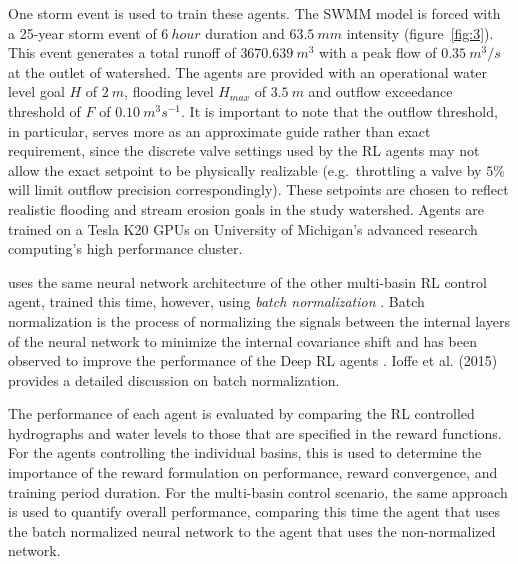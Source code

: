 One storm event is used to train these agents.
The SWMM model is forced with a 25-year storm event of $6\ hour$ duration and $63.5\ mm$ intensity (figure~\ref{fig:3}).
This event generates a total runoff of $3670.639\ m^3$ with a peak flow of $0.35\ m^3 /s$ at the outlet of watershed.
The agents are provided with an operational water level goal $H$ of $2\ m$, flooding level $H_{max}$ of $3.5\ m$ and outflow exceedance threshold of $F$ of $0.10\ m^3s^{-1}$.
It is important to note that the outflow threshold, in particular, serves more as an approximate guide rather than exact requirement, since the discrete valve settings used by the RL agents may not allow the exact setpoint to be physically realizable (e.g.\ throttling a valve by $5\%$ will limit outflow precision correspondingly).
These setpoints are chosen to reflect realistic flooding and stream erosion goals in the study watershed.
Agents are trained on a Tesla K20 GPUs on University of Michigan’s advanced research computing's high performance cluster.

  uses the same neural network architecture of the other multi-basin RL control agent, trained this time, however, using \textit{batch normalization} \cite{ioffe2015batch}.
Batch normalization is the process of normalizing the signals between the internal layers of the neural network to minimize the internal covariance shift and has been observed to improve  the performance of the Deep RL agents \cite{Lillicrap2015ContinuousLearning}.
Ioffe et al. (2015) \cite{ioffe2015batch} provides a detailed discussion on batch normalization.

The performance of each agent is evaluated by comparing the RL controlled hydrographs and water levels to those that are specified in the reward functions.
For the agents controlling the individual basins, this is used to determine the importance of the reward formulation on performance, reward convergence, and training period duration.
For the multi-basin control scenario, the same approach is used to quantify overall performance, comparing this time the agent that uses the batch normalized neural network to the agent that uses the non-normalized network.

